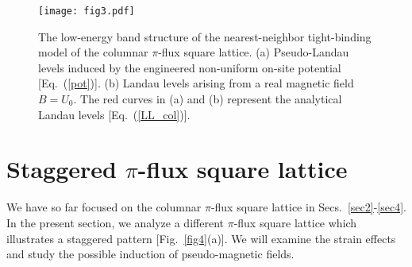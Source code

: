 \documentclass[aps, twocolumn, floatfix, superscriptaddress, prb]{revtex4-1}
\begin{document}
%
\begin{figure}[t]
\centering
\texttt{[image: fig3.pdf]}
\caption{The low-energy band structure of the nearest-neighbor tight-binding model of the columnar $\pi$-flux square lattice. (a) Pseudo-Landau levels induced by the engineered non-uniform on-site potential [Eq.~(\ref{pot})]. (b) Landau levels arising from a real magnetic field $B=U_0$. The red curves in (a) and (b) represent the analytical Landau levels [Eq.~(\ref{LL_col})].
}\label{fig3}
\end{figure}
%



\section{Staggered $\pi$-flux square lattice}
\label{sec5}
We have so far focused on the columnar $\pi$-flux square lattice in Secs.~\ref{sec2}-\ref{sec4}. In the present section, we analyze a different $\pi$-flux square lattice which illustrates a staggered pattern [Fig.~\ref{fig4}(a)]. We will examine the strain effects and study the possible induction of pseudo-magnetic fields.
\end{document}

